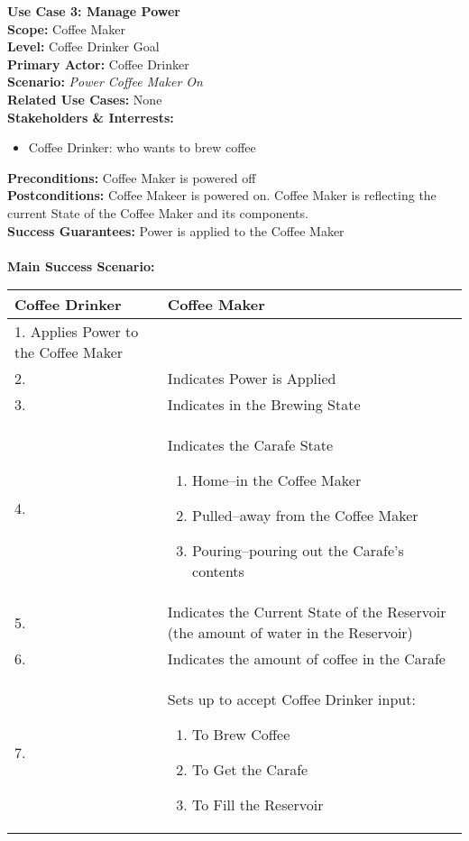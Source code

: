 \documentclass[letterpaper]{article}
\begin{document}
\noindent
\textbf{Use Case 3: Manage Power}\\
\textbf{Scope:  }Coffee Maker\\
\textbf{Level:  }Coffee Drinker Goal\\
\textbf{Primary Actor:  }Coffee Drinker\\
\textbf{Scenario: }\textit{Power Coffee Maker On}\\
\textbf{Related Use Cases:  }None\\
\textbf{Stakeholders \& Interrests:  }
\begin{itemize}
\item Coffee Drinker:  who wants to brew coffee
\end{itemize}
\textbf{Preconditions:  }Coffee Maker is powered off\\
\textbf{Postconditions:  }Coffee Makeer is powered on.  Coffee Maker
is reflecting the current State of the Coffee Maker and its
components.\\
\textbf{Success Guarantees:  }Power is applied to the Coffee Maker\\\\
\textbf{Main Success Scenario:  }\\
\begin{tabular}{|p{5.75cm}|p{5.75cm}|}\hline
\textbf{Coffee Drinker} & \textbf{Coffee Maker}\\\hline
1.  Applies Power to the Coffee Maker & \\\hline
2. & Indicates Power is Applied\\\hline
3. & Indicates in the Brewing State\\\hline
4. & Indicates the Carafe State
\begin{enumerate}
\item Home--in the Coffee Maker
\item Pulled--away from the Coffee Maker
\item Pouring--pouring out the Carafe's contents
\end{enumerate}
\\\hline
5. & Indicates the Current State of the Reservoir (the amount of
water in the Reservoir)\\\hline
6. & Indicates the amount of coffee in the Carafe\\\hline
7. & Sets up to accept Coffee Drinker input:
\begin{enumerate}
\item To Brew Coffee
\item To Get the Carafe
\item To Fill the Reservoir
\end{enumerate}
\\\hline
\end{tabular}\\\\
\end{document}
